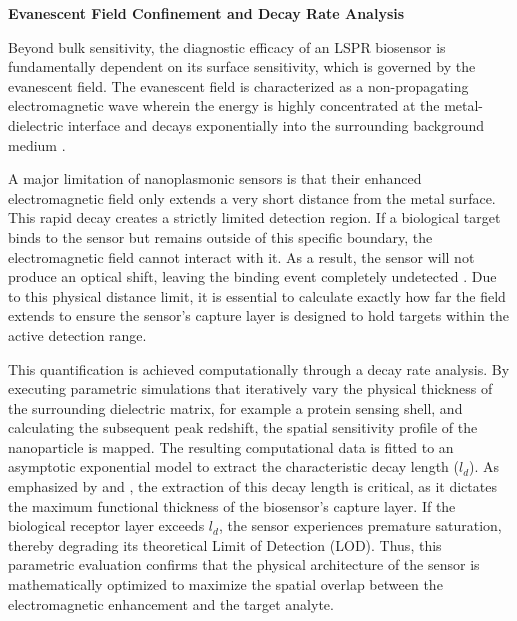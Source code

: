 \documentclass[class=report, crop=false]{standalone}
\begin{document}
\vspace{12pt}

\noindent\textbf{Evanescent Field Confinement and Decay Rate Analysis}

\vspace{6pt}

Beyond bulk sensitivity, the diagnostic efficacy of an LSPR biosensor is fundamentally dependent on its surface sensitivity, which is governed by the evanescent field. The evanescent field is characterized as a non-propagating electromagnetic wave wherein the energy is highly concentrated at the metal-dielectric interface and decays exponentially into the surrounding background medium \citep{Mayer2011}.

\vspace{12pt}

A major limitation of nanoplasmonic sensors is that their enhanced electromagnetic field only extends a very short distance from the metal surface. This rapid decay creates a strictly limited detection region. If a biological target binds to the sensor but remains outside of this specific boundary, the electromagnetic field cannot interact with it. As a result, the sensor will not produce an optical shift, leaving the binding event completely undetected \citep{Grand2020-we}. Due to this physical distance limit, it is essential to calculate exactly how far the field extends to ensure the sensor's capture layer is designed to hold targets within the active detection range.

\vspace{12pt}

This quantification is achieved computationally through a decay rate analysis. By executing parametric simulations that iteratively vary the physical thickness of the surrounding dielectric matrix, for example a protein sensing shell, and calculating the subsequent peak redshift, the spatial sensitivity profile of the nanoparticle is mapped. The resulting computational data is fitted to an asymptotic exponential model to extract the characteristic decay length ($l_d$). As emphasized by \citet{Das2023} and \citet{Mayer2011}, the extraction of this decay length is critical, as it dictates the maximum functional thickness of the biosensor's capture layer. If the biological receptor layer exceeds $l_d$, the sensor experiences premature saturation, thereby degrading its theoretical Limit of Detection (LOD). Thus, this parametric evaluation confirms that the physical architecture of the sensor is mathematically optimized to maximize the spatial overlap between the electromagnetic enhancement and the target analyte.
\end{document}
